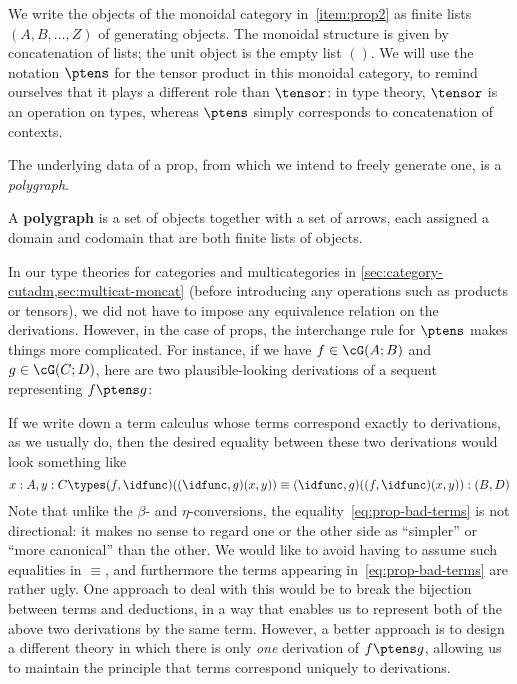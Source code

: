 We write the objects of the monoidal category in~\ref{item:prop2} as finite lists $(A,B,\dots,Z)$ of generating objects.
The monoidal structure is given by concatenation of lists; the unit object is the empty list $()$.
We will use the notation $\ptens$ for the tensor product in this monoidal category, to remind ourselves that it plays a different role than $\tensor$: in type theory, $\tensor$ is an operation on types, whereas $\ptens$ simply corresponds to concatenation of contexts.

The underlying data of a prop, from which we intend to freely generate one, is a \emph{polygraph}.

\begin{defn}
  A \textbf{polygraph} \cG is a set of objects together with a set of arrows, each assigned a domain and codomain that are both finite lists of objects.
\end{defn}

In our type theories for categories and multicategories in \cref{sec:category-cutadm,sec:multicat-moncat} (before introducing any operations such as products or tensors), we did not have to impose any equivalence relation on the derivations.
However, in the case of props, the interchange rule for $\ptens$ makes things more complicated.
For instance, if we have $f\in \cG(A;B)$ and $g\in\cG(C;D)$, here are two plausible-looking derivations of a sequent representing $f\ptens g$:
If we write down a term calculus whose terms correspond exactly to derivations, as we usually do, then the desired equality between these two derivations would look something like
\begin{equation}
  x:A, y:C \types (f,\idfunc)((\idfunc,g)(x,y)) \equiv (\idfunc,g)((f,\idfunc)(x,y)) : (B,D)\label{eq:prop-bad-terms}
\end{equation}
Note that unlike the $\beta$- and $\eta$-conversions, the equality~\eqref{eq:prop-bad-terms} is not directional: it makes no sense to regard one or the other side as ``simpler'' or ``more canonical'' than the other.
We would like to avoid having to assume such equalities in $\equiv$, and furthermore the terms appearing in~\eqref{eq:prop-bad-terms} are rather ugly.
One approach to deal with this would be to break the bijection between terms and deductions, in a way that enables us to represent both of the above two derivations by the same term.
However, a better approach is to design a different theory in which there is only \emph{one} derivation of $f\ptens g$, allowing us to maintain the principle that terms correspond uniquely to derivations.

